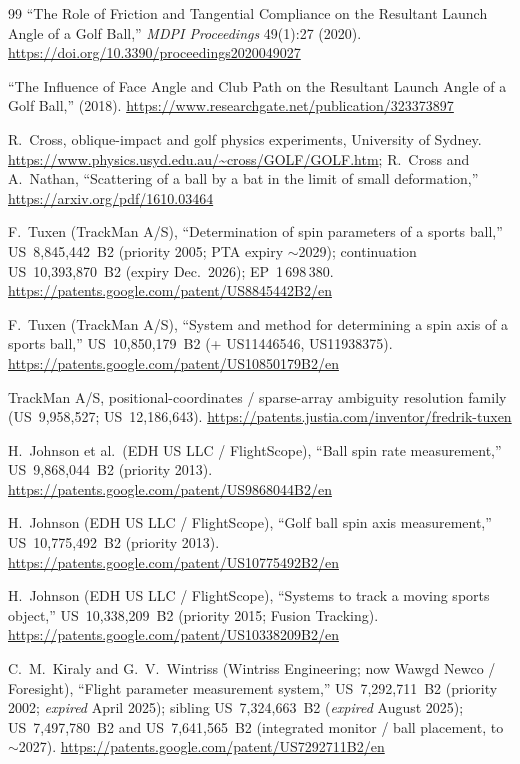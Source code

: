 \begin{thebibliography}{99}
``The Role of Friction and Tangential Compliance on the Resultant Launch
Angle of a Golf Ball,'' \emph{MDPI Proceedings} 49(1):27 (2020).
\url{https://doi.org/10.3390/proceedings2020049027}

``The Influence of Face Angle and Club Path on the Resultant Launch Angle
of a Golf Ball,'' (2018).
\url{https://www.researchgate.net/publication/323373897}

R.~Cross, oblique-impact and golf physics experiments, University of
Sydney. \url{https://www.physics.usyd.edu.au/~cross/GOLF/GOLF.htm};
R.~Cross and A.~Nathan, ``Scattering of a ball by a bat in the limit of
small deformation,'' \url{https://arxiv.org/pdf/1610.03464}


F.~Tuxen (TrackMan A/S), ``Determination of spin parameters of a sports
ball,'' US~8,845,442~B2 (priority 2005; PTA expiry $\sim$2029);
continuation US~10,393,870~B2 (expiry Dec.\ 2026); EP~1\,698\,380.
\url{https://patents.google.com/patent/US8845442B2/en}

F.~Tuxen (TrackMan A/S), ``System and method for determining a spin axis
of a sports ball,'' US~10,850,179~B2 (+ US11446546, US11938375).
\url{https://patents.google.com/patent/US10850179B2/en}

TrackMan A/S, positional-coordinates / sparse-array ambiguity resolution
family (US~9,958,527; US~12,186,643).
\url{https://patents.justia.com/inventor/fredrik-tuxen}

H.~Johnson et al.\ (EDH US LLC / FlightScope), ``Ball spin rate
measurement,'' US~9,868,044~B2 (priority 2013).
\url{https://patents.google.com/patent/US9868044B2/en}

H.~Johnson (EDH US LLC / FlightScope), ``Golf ball spin axis
measurement,'' US~10,775,492~B2 (priority 2013).
\url{https://patents.google.com/patent/US10775492B2/en}

H.~Johnson (EDH US LLC / FlightScope), ``Systems to track a moving sports
object,'' US~10,338,209~B2 (priority 2015; Fusion Tracking).
\url{https://patents.google.com/patent/US10338209B2/en}

C.~M.~Kiraly and G.~V.~Wintriss (Wintriss Engineering; now Wawgd Newco /
Foresight), ``Flight parameter measurement system,'' US~7,292,711~B2
(priority 2002; \emph{expired} April 2025); sibling US~7,324,663~B2
(\emph{expired} August 2025); US~7,497,780~B2 and US~7,641,565~B2
(integrated monitor / ball placement, to $\sim$2027).
\url{https://patents.google.com/patent/US7292711B2/en}


\end{thebibliography}
